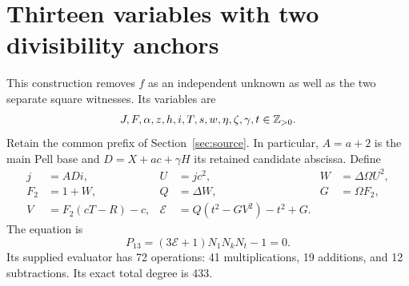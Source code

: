 \section{Thirteen variables with two divisibility anchors}
\label{sec:thirteen}

This construction removes $f$ as an independent unknown as well as the two
separate square witnesses. Its variables are
\[
J,F,\alpha,z,h,i,T,s,w,\eta,\zeta,\gamma,t\in\mathbb Z_{>0}.
\]
Retain the common prefix of Section~\ref{sec:source}. In particular,
$A=a+2$ is the main Pell base and $D=X+ac+\gamma H$ its retained
candidate abscissa. Define
\begin{align*}
j&=ADi,& U&=jc^2,& W&=\Delta\Omega U^2,\\
F_2&=1+W,& Q&=\Delta W,& G&=\Omega F_2,\\
V&=F_2(cT-R)-c,&
\mathcal E&=Q(t^2-GV^2)-t^2+G.
\end{align*}
The equation is
\begin{equation}\label{eq:thirteen}
\boxed{P_{13}=(3\mathcal E+1)N_1N_kN_t-1=0.}
\end{equation}
Its supplied evaluator has 72 operations: 41 multiplications, 19 additions,
and 12 subtractions. Its exact total degree is 433.

